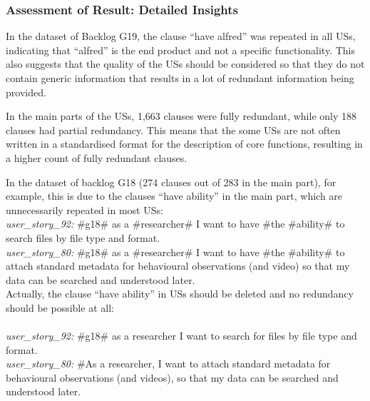 \endgroup


\subsubsection*{Assessment of Result: Detailed Insights}
In the dataset of Backlog G19, the clause \enquote{have alfred} was repeated in all USs, indicating that \enquote{alfred} is the end product and not a specific functionality. This also suggests that the quality of the USs should be considered so that they do not contain generic information that results in a lot of redundant information being provided.

In the main parts of the USs, 1,663 clauses were fully redundant, while only 188 clauses had partial redundancy. This means that the some USs are not often written in a standardised format for the description of core functions, resulting in a higher count of fully redundant clauses. 
\begin{example}
In the dataset of backlog G18 (274 clauses out of 283 in the main part), for example, this is due to the clauses \enquote{have ability} in the main part, which are unnecessarily repeated in most USs:\\
\textit{user\_story\_92:} \#g18\# as a \#researcher\# I want to have \#the \#ability\# to search files by file type and format.\\
\textit{user\_story\_80:} \#g18\# as a \#researcher\# I want to have \#the \#ability\# to attach standard metadata for behavioural observations (and video) so that my data can be searched and understood later.\\
Actually, the clause \enquote{have ability} in USs should be deleted and no redundancy should be possible at all:\\\\
\textit{user\_story\_92:} \#g18\# as a researcher I want to search for files by file type and format.\\
\textit{user\_story\_80:} \#As a researcher, I want to attach standard metadata for behavioural observations (and videos), so that my data can be searched and understood later.
\end{example}

